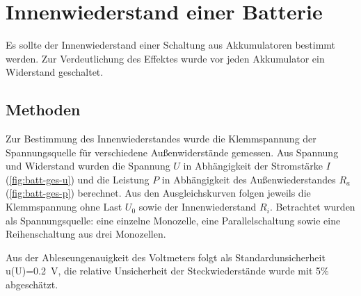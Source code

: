 



\section{Innenwiederstand einer Batterie}

Es sollte der Innenwiederstand einer Schaltung aus Akkumulatoren bestimmt werden. Zur Verdeutlichung des Effektes wurde vor jeden Akkumulator ein Widerstand geschaltet. 

\subsection{Methoden}


Zur Bestimmung des Innenwiederstandes wurde die Klemmspannung der Spannungsquelle für verschiedene Außenwiderstände gemessen. Aus Spannung und Widerstand wurden die Spannung $U$ in Abhängigkeit der Stromstärke $I$ (\cref{fig:batt-ges-u}) und die Leistung $P$ in Abhängigkeit des Außenwiederstandes $R_a$ (\cref{fig:batt-ges-p}) berechnet. Aus den Ausgleichskurven folgen jeweils die Klemmspannung ohne Last $U_0$ sowie der Innenwiederstand $R_i$. Betrachtet wurden als Spannungsquelle: eine einzelne Monozelle, eine Parallelschaltung sowie eine Reihenschaltung aus drei Monozellen. 

Aus der Ableseungenauigkeit des Voltmeters folgt als Standardunsicherheit u(U)=\SI{0.2}{V}, die relative Unsicherheit der Steckwiederstände wurde mit 5\% abgeschätzt.





